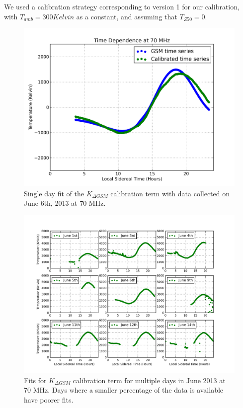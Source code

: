 We used a calibration strategy corresponding to version 1 for our calibration, with $T_{amb} = 300 Kelvin$ as a constant, and assuming that $T_{Z50}=0$. 

\begin{figure}[htb]
\begin{center}
\includegraphics[width=0.95\linewidth]{Data_analysis/figures/June_06_K_dgsm_time_series.png}
\caption{Single day fit of the $K_{\Delta GSM}$ calibration term with data collected on June 6th, 2013 at 70 MHz. }
\label{Fig:Kdgsm}
\end{center}
\end{figure}

\begin{figure}[htb]
\begin{center}
\includegraphics[width=0.95\linewidth]{Data_analysis/figures/Combined_Kdgsm_time_series.png}
\caption{Fits for $K_{\Delta GSM}$ calibration term for multiple days in June 2013 at 70 MHz. Days where a smaller percentage of the data is available have poorer fits. }
\label{Fig:Kdgsm_var}
\end{center}
\end{figure}


